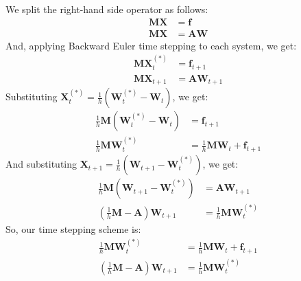 \documentclass{article}
\newcommand{\bvec}[1]{\boldsymbol{#1}}
\newcommand{\bmat}[1]{\boldsymbol{#1}}
\begin{document}
We split the right-hand side operator as follows:
\begin{align*}
    \bmat{M} \bvec{X} & = \bvec{f} \\
    \bmat{M} \bvec{X} & = \bmat{A} \bvec{W}
\end{align*}
And, applying Backward Euler time stepping to each system, we get:
\begin{align*}
    \bmat{M} \bvec{X}_t^{(*)} & = \bvec{f}_{t + 1} \\
    \bmat{M} \bvec{X}_{t + 1} & = \bvec{A} \bvec{W}_{t + 1}
\end{align*}
\noindent Substituting $\bvec{X}_t^{(*)} = \frac{1}{h} (\bvec{W}_t^{(*)} - \bvec{W}_t)$,
we get:
\begin{align*}
    \frac{1}{h} \bmat{M} (\bvec{W}_t^{(*)} - \bvec{W}_t) & = \bvec{f}_{t + 1} \\
    \frac{1}{h} \bmat{M} \bvec{W}_t^{(*)} & = \frac{1}{h} \bmat{M} \bvec{W}_t + \bvec{f}_{t + 1}
\end{align*}
\noindent And substituting $\bvec{X}_{t + 1} = \frac{1}{h} (\bvec{W}_{t + 1} - \bvec{W}_t^{(*)})$,
we get:
\begin{align*}
    \frac{1}{h} \bmat{M} (\bvec{W}_{t + 1} - \bvec{W}_t^{(*)}) & = \bmat{A} \bvec{W}_{t + 1} \\
    (\frac{1}{h} \bmat{M} - \bmat{A}) \bvec{W}_{t + 1} & = \frac{1}{h} \bmat{M} \bvec{W}_t^{(*)}
\end{align*}
\noindent So, our time stepping scheme is:
\begin{align*}
    \frac{1}{h} \bmat{M} \bvec{W}_t^{(*)} & = \frac{1}{h} \bmat{M} \bvec{W}_t + \bvec{f}_{t + 1} \\
    (\frac{1}{h} \bmat{M} - \bmat{A}) \bvec{W}_{t + 1} & = \frac{1}{h} \bmat{M} \bvec{W}_t^{(*)}
\end{align*}
\end{document}
